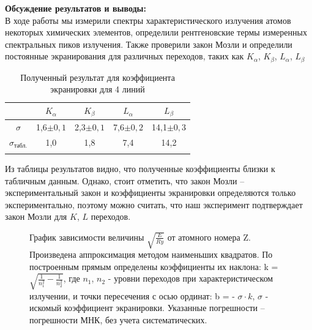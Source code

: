 \documentclass[a4paper, 12pt]{article}%
\begin{document}
\begin{enumerate}
			\newpage
			\textbf{Обсуждение результатов и выводы: }\\
			
			В ходе работы мы измерили спектры характеристического излучения атомов некоторых химических элементов, определили рентгеновские термы измеренных спектральных пиков излучения. Также проверили закон Мозли и определили постоянные экранирования для различных переходов, таких как $K_{\alpha}$, $K_{\beta}$,  $L_{\alpha}$, $L_{\beta}$
			
			\begin{longtable}{|c|c|c|c|c|}
				\hline
				& $K_{\alpha}$ & $K_{\beta}$ & $L_{\alpha}$ & $L_{\beta}$ \\ \hline
				$\sigma$ & 1,6$\pm 0,1$ & 2,3$\pm 0,1$ & 7,6$\pm 0,2$ & 14,1$\pm 0,3$ \\ \hline
				$\sigma_{\text{табл.}}$ & 1,0 & 1,8 & 7,4 & 14,2 \\ \hline
				\caption{Полученный результат для коэффициента экранировки для 4 линий}
			\end{longtable}
			
			Из таблицы результатов видно, что полученные коэффициенты близки к табличным данным. Однако, стоит отметить, что закон Мозли -- экспериментальный закон и коэффициенты экранировки определяются только экспериментально, поэтому можно считать, что наш эксперимент подтверждает закон Мозли для  $K$,  $L$ переходов.
			
			\newpage
		
		
		\begin{figure}[H]
			\caption{График зависимости величины $\sqrt{\frac{E}{Ry}}$ от атомного номера Z. Произведена аппроксимация методом наименьших квадратов. По построенным прямым определены коэффициенты их наклона: k = $\sqrt{\frac{1}{n_1^2} - \frac{1}{n_2^2}}$, где $n_1$, $n_2$ - уровни переходов при характеристическом излучении, и точки пересечения с осью ординат: b = - $\sigma \cdot k$, $\sigma$ - искомый коэффициент экранировки. Указанные погрешности -- погрешности МНК, без учета систематических.}
		\end{figure}
		

\end{enumerate}
\end{document}
